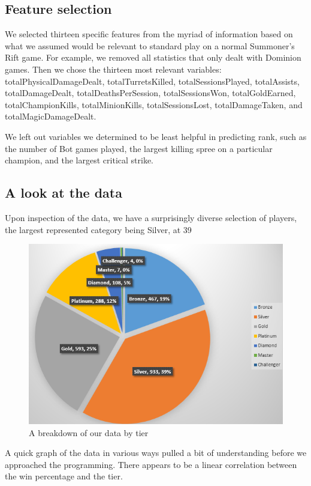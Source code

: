 \documentclass{article} %
\begin{document}
\subsection{Feature selection}
We selected thirteen specific features from the myriad of information based on what we assumed would be relevant to standard play on a normal Summoner's Rift game. For example, we removed all statistics that only dealt with Dominion games. Then we chose the thirteen most relevant variables: totalPhysicalDamageDealt, totalTurretsKilled, totalSessionsPlayed, totalAssists, totalDamageDealt, totalDeathsPerSession, totalSessionsWon, totalGoldEarned, totalChampionKills, totalMinionKills, totalSessionsLost, totalDamageTaken, and totalMagicDamageDealt.

We left out variables we determined to be least helpful in predicting rank, such as the number of Bot games played, the largest killing spree on a particular champion, and the largest critical strike.


\subsection{A look at the data}
Upon inspection of the data, we have a surprisingly diverse selection of players, the largest represented category being Silver, at 39%

\begin{figure}[h!]
\centering
\includegraphics[scale=0.9]{tiers-pie.png}
\caption{A breakdown of our data by tier}
\label{fig:univerise}
\end{figure}

A quick graph of the data in various ways pulled a bit of understanding before we approached the programming. There appears to be a linear correlation between the win percentage and the tier.
\end{document}
